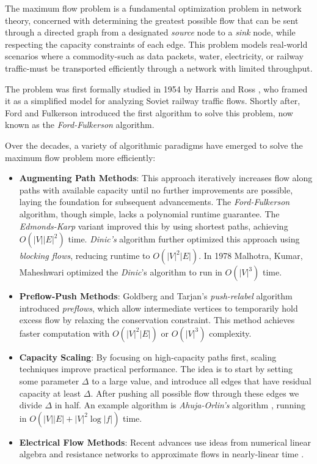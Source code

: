
The maximum flow problem is a fundamental optimization problem in network theory, concerned with determining the greatest possible flow that can be sent through a directed graph from a designated \emph{source} node to a \emph{sink} node, while respecting the capacity constraints of each edge. This problem models real-world scenarios where a commodity-such as data packets, water, electricity, or railway traffic-must be transported efficiently through a network with limited throughput.

The problem was first formally studied in 1954 by Harris and Ross \cite{harris}, who framed it as a simplified model for analyzing Soviet railway traffic flows. Shortly after, Ford and Fulkerson \cite{ford1956} introduced the first algorithm to solve this problem, now known as the \textit{Ford-Fulkerson} algorithm. 

Over the decades, a variety of algorithmic paradigms have emerged to solve the maximum flow problem more efficiently:

\begin{itemize}
    \item \textbf{Augmenting Path Methods}: This approach iteratively increases flow along paths with available capacity until no further improvements are possible, laying the foundation for subsequent advancements. The \textit{Ford-Fulkerson} algorithm, though simple, lacks a polynomial runtime guarantee. The \emph{Edmonds-Karp} variant \cite{edmonds1972} improved this by using shortest paths, achieving $O(|V||E|^2)$ time. \emph{Dinic's} algorithm \cite{dinic1970} further optimized this approach using \emph{blocking flows}, reducing runtime to $O(|V|^2|E|)$. In 1978 Malhotra, Kumar, Maheshwari \cite{MKM} optimized the \textit{Dinic}'s algorithm to run in $O(|V|^3)$ time.
    
    \item \textbf{Preflow-Push Methods}: Goldberg and Tarjan's \emph{push-relabel} algorithm \cite{PushRelabel} introduced \emph{preflows}, which allow intermediate vertices to temporarily hold excess flow by relaxing the conservation constraint. This method achieves faster computation with $O(|V|^2|E|)$ or $O(|V|^3)$ complexity.

    \item \textbf{Capacity Scaling}: By focusing on high-capacity paths first, scaling techniques improve practical performance. The idea is to start by setting some parameter $\Delta$ to a large value, and introduce all edges that have residual capacity at least $\Delta$. After pushing all possible flow through these edges we divide $\Delta$ in half. An example algorithm is \emph{Ahuja-Orlin's} algorithm \cite{ahuja}, running in $O(|V||E| + |V|^2 \log |f|)$ time.
    
    \item \textbf{Electrical Flow Methods}: Recent advances use ideas from numerical linear algebra and resistance networks to approximate flows in nearly-linear time \cite{madry2016}.
\end{itemize}

